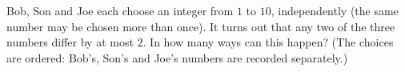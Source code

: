 Bob, Son and Joe each choose an integer from $1$ to $10$, independently (the same number may be chosen more than once). It turns out that any two of the three numbers differ by at most $2$. In how many ways can this happen? (The choices are ordered: Bob's, Son's and Joe's numbers are recorded separately.)
